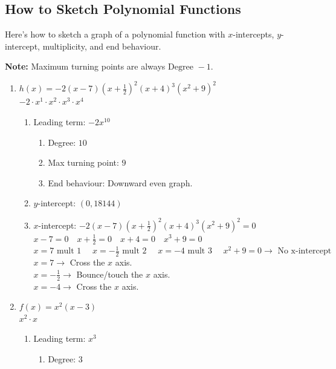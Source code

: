 \subsection{How to Sketch Polynomial Functions}
Here's how to sketch a graph of a polynomial function with $x$-intercepts, $y$-intercept, multiplicity, and end behaviour.

\textbf{Note: }Maximum turning points are always $\text{Degree } - 1 $.

\begin{example}
  \hfill
  \begin{enumerate}
  \item $h(x) = -2(x - 7)\left(x + \frac{1}{2}\right)^2(x + 4)^3(x^2 + 9)^2$ \\
    $-2 \cdot x^1 \cdot x^2 \cdot x^3 \cdot x^4$
    \begin{enumerate}
    \item Leading term: $-2x^{10}$
      \begin{enumerate}
      \item Degree: $10$
      \item Max turning point: $9$
      \item End behaviour: Downward even graph.
      \end{enumerate}
    \item $y$-intercept: $(0, 18144)$
    \item $x$-intercept: $-2(x - 7)\left(x + \frac{1}{2}\right)^2(x + 4)^3(x^2 + 9)^2 = 0$ \\
      $x - 7 = 0 \quad x + \frac{1}{2} = 0 \quad  x + 4 = 0 \quad x^3 + 9 = 0$ \\
      $x = 7 \text{ mult 1 }\quad x = -\frac{1}{2} \text{ mult 2 } \quad x = -4 \text{ mult 3 }\quad x^2 + 9 = 0 \to \text{ No x-intercept }$ \\
      $x = 7 \to$ Cross the $x$ axis. \\
      $x = -\frac{1}{2} \to$ Bounce/touch the $x$ axis. \\
      $x = -4 \to $ Cross the $x$ axis. \\
    \end{enumerate}
  \item $f(x) = x^2(x - 3)$ \\
    $x^2 \cdot x$ \\
    \begin{enumerate}
    \item Leading term: $x^3$
      \begin{enumerate}
      \item Degree: $3$

\end{enumerate}
\end{enumerate}
\end{enumerate}
\end{example}
